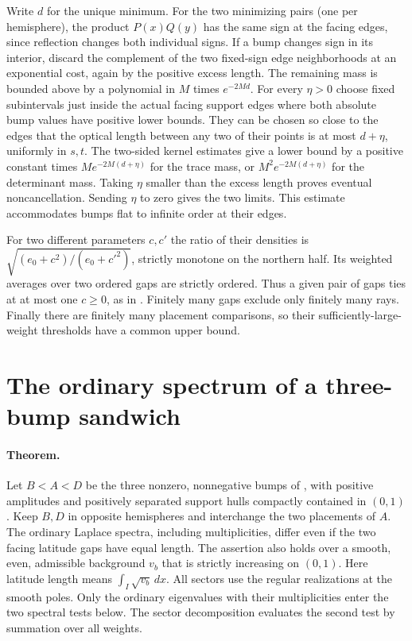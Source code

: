 \documentclass[11pt,letterpaper]{article}
\begin{document}
Write \(d\) for the unique minimum. For the two minimizing pairs
(one per hemisphere), the product \(P(x)Q(y)\) has the same sign
at the facing edges, since reflection changes both individual signs.
If a bump changes sign in its interior, discard the complement of
the two fixed-sign edge neighborhoods at an exponential cost, again
by the positive excess length. The remaining mass is bounded above
by a polynomial in \(M\) times \(e^{-2Md}\). For every \(\eta>0\)
choose fixed subintervals just inside the actual facing support edges
where both absolute bump values have positive lower bounds. They
can be chosen so close to the edges that the optical length between
any two of their points is at most \(d+\eta\), uniformly in \(s,t\).
The two-sided kernel estimates give a lower bound by a positive
constant times \(M e^{-2M(d+\eta)}\) for the trace mass, or
\(M^2e^{-2M(d+\eta)}\) for the determinant mass.
Taking \(\eta\) smaller than the excess length proves eventual
noncancellation. Sending \(\eta\) to zero gives the two limits.
This estimate accommodates bumps flat to infinite order at their edges.

For two different parameters \(c,c'\) the ratio of their densities is
\(\sqrt{(e_0+c^2)/(e_0+c'^2)}\), strictly monotone on the northern
half. Its weighted averages over two ordered gaps are strictly ordered.
Thus a given pair of gaps ties at at most one \(c\geq0\), as in
\cite[Proposition~10.4]{original}. Finitely many gaps exclude only
finitely many rays. Finally there are finitely many placement comparisons,
so their sufficiently-large-weight thresholds have a common upper bound.

\section{The ordinary spectrum of a three-bump sandwich}

\paragraph{Theorem.}
Let \(B<A<D\) be the three nonzero, nonnegative bumps of
\cite[Section~5]{original}, with positive amplitudes and positively separated
support hulls compactly contained in \((0,1)\). Keep \(B,D\) in opposite
hemispheres and interchange the two placements of \(A\).
The ordinary Laplace spectra, including multiplicities, differ even if
the two facing latitude gaps have equal length. The assertion also
holds over a smooth, even, admissible background \(v_b\) that is
strictly increasing on \((0,1)\). Here latitude length means
\(\int_I\sqrt{v_b}\,dx\). All sectors use the regular realizations
at the smooth poles.
Only the ordinary eigenvalues with their multiplicities enter the two
spectral tests below. The sector decomposition evaluates the second test
by summation over all weights.
\end{document}
